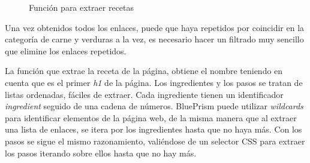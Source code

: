 \begin{figure}[h!]
    \centering
    \caption{Función para extraer recetas}
    \label{fig:recipe}
\end{figure}

Una vez obtenidos todos los enlaces, puede que haya repetidos por coincidir en la categoría de carne y verduras a la vez, es necesario hacer un filtrado muy sencillo que elimine los enlaces repetidos. 

La función que extrae la receta de la página, obtiene el nombre teniendo en cuenta que es el primer \emph{h1} de la página. Los ingredientes y los pasos se tratan de listas ordenadas, fáciles de extraer. Cada ingrediente tienen un identificador \emph{ingredient} seguido de una cadena de números. BluePrism puede utilizar \emph{wildcards} para identificar elementos de la página web, de la misma manera que al extraer una lista de enlaces, se itera por los ingredientes hasta que no haya más. Con los pasos se sigue el mismo razonamiento, valiéndose de un selector \gls{CSS} para extraer los pasos iterando sobre ellos hasta que no hay más. 

